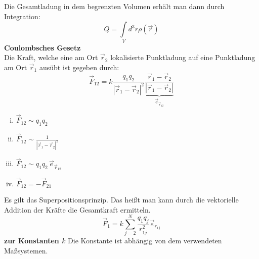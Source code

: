 \documentclass[titlepage,11pt,a4paper,ngerman]{report}
\begin{document}
Die Gesamtladung in dem begrenzten Volumen erhält man dann durch Integration:
\begin{equation*}
Q = \int \limits_V d^3 r \rho(\vec{r})
\end{equation*}
\textbf{Coulombsches Gesetz}\\
Die Kraft, welche eine am Ort $ \vec{r}_2 $ lokalisierte Punktladung auf eine Punktladung am Ort $ \vec{r}_1 $ ausübt ist gegeben durch:
\begin{equation*}
\vec{F}_{12} = k \frac{q_1 q_2}{|\vec{r}_1 - \vec{r}_2|^2} \underbrace{\frac{\vec{r}_1 - \vec{r}_2}{|\vec{r}_1 - \vec{r}_2|}}_{\vec{e}_{\vec{r}_{12}}}
\end{equation*}
\begin{enumerate}[i)]
	\item $ \vec{F}_{12} \sim q_1 q_2 $
	\item $ \vec{F}_{12} \sim \frac{1}{|\vec{r}_1 - \vec{r}_2|^2}$
	\item $ \vec{F}_{12} \sim q_1 q_2 \, \vec{e}_{\vec{r}_{12}} $
	\item $ \vec{F}_{12} = - \vec{F}_{21} $
\end{enumerate}
Es gilt das Superpositionsprinzip. Das heißt man kann durch die vektorielle Addition der Kräfte die Gesamtkraft ermitteln.
\begin{equation*}
\vec{F}_1 = k \sum \limits_{j=2}^{N} \frac{q_1 q_j}{r_{1j}^2} \vec{e}_{r_{1j}}
\end{equation*}
\textbf{zur Konstanten $ k $}
Die Konstante ist abhängig von dem verwendeten Maßsystemen.
\end{document}
